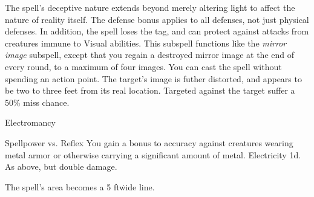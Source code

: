 The spell's deceptive nature extends beyond merely altering light to affect the nature of reality itself.
The defense bonus applies to all defenses, not just physical defenses.
In addition, the spell loses the  tag, and can protect against attacks from creatures immune to Visual abilities.
This subspell functions like the \textit{mirror image} subspell, except that you regain a destroyed mirror image at the end of every round, to a maximum of four images.
You can cast the spell without spending an action point.
The target's image is futher distorted, and appears to be two to three feet from its real location.
Targeted  against the target suffer a 50\% miss chance.
\begin{spellsection}{Electromancy}
\begin{spellheader}
\end{spellheader}
\begin{spellcontent}
\begin{spelltargetinginfo}
\end{spelltargetinginfo}
\begin{spelleffects}
\begin{spellattack}{Spellpower vs. Reflex}
\spellspecial You gain a  bonus to accuracy against creatures wearing metal armor or otherwise carrying a significant amount of metal.
\spellsuccess
Electricity  \minus1d.
\spellcritical As above, but double damage.
\end{spellattack}
\end{spelleffects}
\end{spellcontent}
\begin{spellfooter}
\end{spellfooter}
\begin{spellsubcontent}
\begin{spellcantrip}
The spell's area becomes a 5 ft\. wide \areamed line.
\end{spellcantrip}
\end{spellsubcontent}
\end{spellsection}
